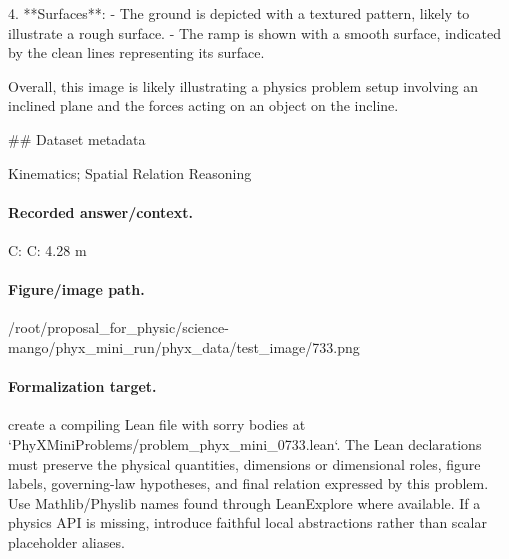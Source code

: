 4. **Surfaces**:
   - The ground is depicted with a textured pattern, likely to illustrate a rough surface.
   - The ramp is shown with a smooth surface, indicated by the clean lines representing its surface.

Overall, this image is likely illustrating a physics problem setup involving an inclined plane and the forces acting on an object on the incline.

\#\# Dataset metadata

Kinematics; Spatial Relation Reasoning

\paragraph{Recorded answer/context.}
C: C: 4.28 m

\paragraph{Figure/image path.}
/root/proposal\_for\_physic/science-mango/phyx\_mini\_run/phyx\_data/test\_image/733.png

\paragraph{Formalization target.}
create a compiling Lean file with sorry bodies at `PhyXMiniProblems/problem\_phyx\_mini\_0733.lean`. The Lean declarations must preserve the physical quantities, dimensions or dimensional roles, figure labels, governing-law hypotheses, and final relation expressed by this problem.
Use Mathlib/Physlib names found through LeanExplore where available. If a physics API is missing, introduce faithful local abstractions rather than scalar placeholder aliases.

